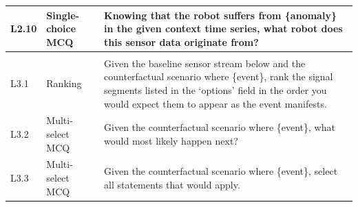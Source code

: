 \documentclass{article}
\begin{document}
\begin{small}
\begin{longtable}{@{}>{\centering\arraybackslash}p{}>{\raggedright\arraybackslash}p{}>{\raggedright\arraybackslash}p{}@{}}
        L2.10       & Single-choice MCQ      & Knowing that the robot suffers from \{anomaly\} in the given context time series, what robot does this sensor data originate from?                                                                                                                                                                                                                                                                                                                                                                 \\
        \midrule

        \multicolumn{3}{@{}l@{}}{\textbf{Level 3: Counterfactual}}                                                                                                                                                                                                                                                                                                                                                                                                                                                                                \\
        \midrule
        L3.1        & Ranking                & Given the baseline sensor stream below and the counterfactual scenario where \{event\}, rank the signal segments listed in the `options' field in the order you would expect them to appear as the event manifests.                                                                                                                                                                                                                                                                                \\
        L3.2        & Multi-select MCQ       & Given the counterfactual scenario where \{event\}, what would most likely happen next?                                                                                                                                                                                                                                                                                                                                                                                                             \\
        L3.3        & Multi-select MCQ       & Given the counterfactual scenario where \{event\}, select all statements that would apply.                                                                                                                                                                                                                                                                                                                                                                                                         \\

\end{longtable}
\end{small}
\end{document}
